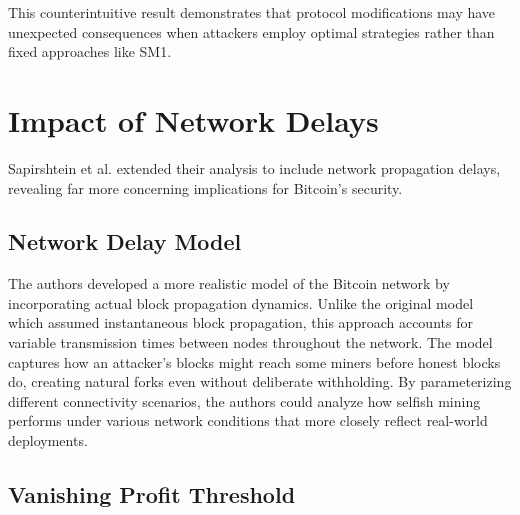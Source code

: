 \documentclass[conference]{IEEEtran}
\begin{document}
This counterintuitive result demonstrates that protocol modifications may have unexpected consequences when attackers employ optimal strategies rather than fixed approaches like SM1.



\section{Impact of Network Delays}

Sapirshtein et al. extended their analysis to include network propagation delays, revealing far more concerning implications for Bitcoin's security.

\subsection{Network Delay Model}

The authors developed a more realistic model of the Bitcoin network by incorporating actual block propagation dynamics. Unlike the original model which assumed instantaneous block propagation, this approach accounts for variable transmission times between nodes throughout the network. The model captures how an attacker's blocks might reach some miners before honest blocks do, creating natural forks even without deliberate withholding. By parameterizing different connectivity scenarios, the authors could analyze how selfish mining performs under various network conditions that more closely reflect real-world deployments.

\subsection{Vanishing Profit Threshold}
\end{document}
